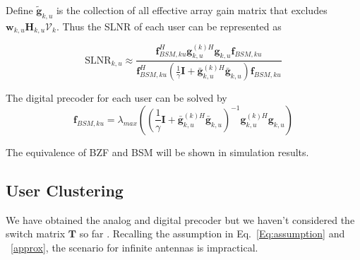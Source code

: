 \documentclass[conference]{IEEEtran}
\begin{document}
{Define $\tilde{\bm{g}}_{k,u}$ is the collection of all effective array gain matrix that excludes $\bm{w}_{k,u} \bm{H}_{k,u} \bm{\mathcal{V}}_k$. Thus the SLNR of each user can be represented as

\begin{equation}
\text{SLNR}_{k,u} \approx \frac{\bm{f}_{BSM, ku}^H{\bm{g}}_{k,u}^{(k)H}{\bm{g}}_{k,u} \bm{f}_{BSM, ku}}{\bm{f}_{BSM, ku}^H(\frac{1}{\gamma}\bm{I}+\bar{\bm{g}}_{k,u}^{(k)H}\bar{\bm{g}}_{k,u})\bm{f}_{BSM, ku}}
\end{equation}

The digital precoder for each user can be solved by \cite{wang2012statistical}
\begin{equation}
	\bm{f}_{BSM,ku} = \lambda_{max}\left( \left(\frac{1}{\gamma}\bm{I}+\bar{\bm{g}}_{k,u}^{(k)H}\bar{\bm{g}}_{k,u} \right)^{-1}{\bm{g}}_{k,u}^{(k)H}{\bm{g}}_{k,u} \right)
\end{equation}

The equivalence of BZF and BSM  will be shown in simulation results.

\subsection{User Clustering}
We have obtained the analog and digital precoder but we haven't considered the switch matrix $\bm{T}$ so far . Recalling the assumption in Eq.~\eqref{Eq:assumption} and ~\eqref{approx}, the scenario for  infinite antennas is impractical.

}
\end{document}
